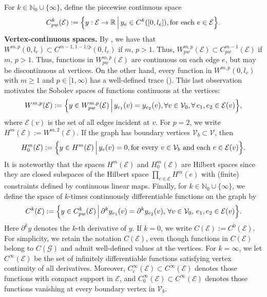 \documentclass[10pt,a4paper]{amsart}
\def\to{\rightarrow}
\begin{document}
 For $k \in \mathbb{N}_0\cup\{\infty\}$, define the piecewise continuous space
\[
C_{pw}^k(\mathcal{E})
:=
\Bigl\{
  y:\mathcal{E}\to\mathbb{R}
  \,\Big|\,
  y_e \in C^k([0,l_e]),\text{for each }e\in\mathcal{E}
\Bigr\}.
\]
\textbf{Vertex-continuous spaces.} By \cite[Chap. 5.6, Thm. 6]{evans_book}, we have that $W^{m,p}(0,l_e)\subset C^{m-1,1-1/p}(0,l_e)$ if $m,\,p>1$. Thus, $W_{pw}^{m,p}(\mathcal{E}) \subset C^{m-1}_{pw}(\mathcal{E})$ if $m,\,p>1$. Thus, functions in $W_{pw}^{m,p}(\mathcal{E})$ are continuous on each edge $e$, but may be discontinuous at vertices. On the other hand, every function in $W^{m,p}(0,l_e)$ with $m\geq1$ and $p\in[1,\infty)$ has a well-defined trace (\cite[Chapter 5.5, Theorem 1]{evans_book}). This last observation motivates the Sobolev spaces of functions continuous at the vertices:
\[
W^{m,p}(\mathcal{E})
:=
\Bigl\{
  y \in W_{pw}^{m,p}(\mathcal{E})
  \,\Big|\,
  y_{e_1}(v) = y_{e_2}(v), 
  \forall v\in\mathcal{V}_0,\forall\,e_1,e_2\in\mathcal{E}(v)
\Bigr\},
\]
where $\mathcal{E}(v)$ is the set of all edges incident at $v$. For $p=2$, we write $H^m(\mathcal{E}):=W^{m,2}(\mathcal{E})$. If the graph has boundary vertices $\mathcal{V}_b\subset\mathcal{V}$, then
\[
H_0^m(\mathcal{E})
:=
\Bigl\{
  y \in H^m(\mathcal{E})
  \,\Big|\,
  y_e(v)=0,
  \text{for every }v\in\mathcal{V}_b
  \text{ and each } e\in\mathcal{E}(v)
\Bigr\}.
\]
It is noteworthy that the spaces $H^m(\mathcal{E})$ and $H_0^m(\mathcal{E})$ are Hilbert spaces since they are closed subspaces of the Hilbert space $\prod_{e\in \mathcal{E}} H^m(e)$ with (finite) constraints defined by continuous linear maps. Finally, for $k\in \mathbb{N}_0\cup\{\infty\}$, we define the space of $k$-times continuously differentiable functions on the graph by 
\begin{align}\label{eq:continuous_functions}
C^k(\mathcal{E})
:=
\Bigl\{
   y \in C_{pw}^k(\mathcal{E})
   \,\Big|\,
   \partial^k y_{e_1}(v)
   =
   \partial^k y_{e_2}(v),\,
   \forall v\in\mathcal{V}_0,\,
   e_1,e_2 \in\mathcal{E}(v)
\Bigr\}.
\end{align}
Here $\partial^k y$ denotes the $k$-th derivative of $y$. If $k=0$, we write $C(\mathcal{E}):=C^0(\mathcal{E})$. For simplicity, we retain the notation $C(\mathcal{E})$, even though functions in $C(\mathcal{E})$ belong to $C(\mathcal{G})$ and admit well-defined values at the vertices. For $k=\infty$, we let $C^\infty(\mathcal{E})$ be the set of infinitely differentiable functions satisfying vertex continuity of all derivatives. Moreover,
$C^\infty_c(\mathcal{E})
\subset
C^\infty(\mathcal{E})$ denotes those functions with compact support in $\mathcal{E}$, and $C^\infty_0(\mathcal{E})
\subset
C^\infty(\mathcal{E})$ denotes those functions vanishing at every boundary vertex in $\mathcal{V}_b$.
\end{document}
